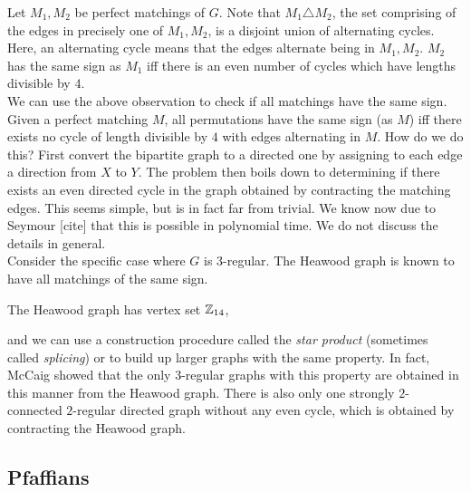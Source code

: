 Let $M_1,M_2$ be perfect matchings of $G$. Note that $M_1 \triangle M_2$, the set comprising of the edges in precisely one of $M_1,M_2$, is a disjoint union of alternating cycles. Here, an alternating cycle means that the edges alternate being in $M_1,M_2$. $M_2$ has the same sign as $M_1$ iff there is an even number of cycles which have lengths divisible by $4$.\\
We can use the above observation to check if all matchings have the same sign. Given a perfect matching $M$, all permutations have the same sign (as $M$) iff there exists no cycle of length divisible by $4$ with edges alternating in $M$. How do we do this? First convert the bipartite graph to a directed one by assigning to each edge a direction from $X$ to $Y$. The problem then boils down to determining if there exists an even directed cycle in the graph obtained by contracting the matching edges. This seems simple, but is in fact far from trivial. We know now due to Seymour [cite] that this is possible in polynomial time. We do not discuss the details in general. \\
Consider the specific case where $G$ is $3$-regular. The Heawood graph is known to have all matchings of the same sign.
\begin{fex}
	The Heawood graph has vertex set $\mathbb{Z}_{14}$, 
\end{fex}
and we can use a construction procedure called the \emph{star product} (sometimes called \emph{splicing}) or to build up larger graphs with the same property. In fact, McCaig showed that the only $3$-regular graphs with this property are obtained in this manner from the Heawood graph. There is also only one strongly $2$-connected $2$-regular directed graph without any even cycle, which is obtained by contracting the Heawood graph. %


\subsection{Pfaffians}

